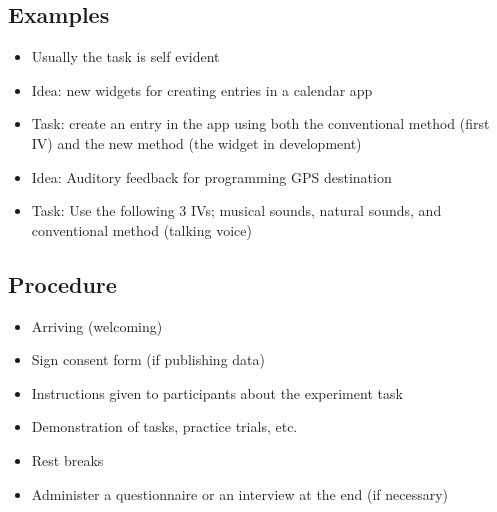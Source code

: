 \documentclass[12pt]{book}
\begin{document}
\subsection*{Examples}
\begin{itemize}
  \item Usually the task is self evident
  \item Idea: new widgets for creating entries in a calendar app
  \item Task: create an entry in the app using both the conventional method (first IV) and the new method (the widget in development)
  \item Idea: Auditory feedback for programming GPS destination
  \item Task: Use the following 3 IVs; musical sounds, natural sounds, and conventional method (talking voice)
\end{itemize}

\subsection*{Procedure}
\begin{itemize}
  \item Arriving (welcoming)
  \item Sign consent form (if publishing data)
  \item Instructions given to participants about the experiment task
  \item Demonstration of tasks, practice trials, etc.
  \item Rest breaks
  \item Administer a questionnaire or an interview at the end (if necessary)
\end{itemize}
\end{document}
